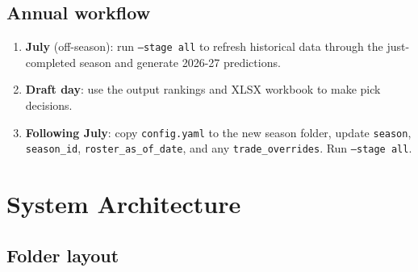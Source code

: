 \documentclass[11pt, a4paper]{article}
\begin{document}
\subsection{Annual workflow}

\begin{enumerate}[leftmargin=*]
  \item \textbf{July} (off-season): run \texttt{--stage all} to refresh historical data through
        the just-completed season and generate 2026-27 predictions.
  \item \textbf{Draft day}: use the output rankings and XLSX workbook to make pick decisions.
  \item \textbf{Following July}: copy \texttt{config.yaml} to the new season folder, update
        \texttt{season}, \texttt{season\_id}, \texttt{roster\_as\_of\_date}, and any
        \texttt{trade\_overrides}. Run \texttt{--stage all}.
\end{enumerate}


\section{System Architecture}
\label{sec:architecture}

\subsection{Folder layout}
\end{document}
